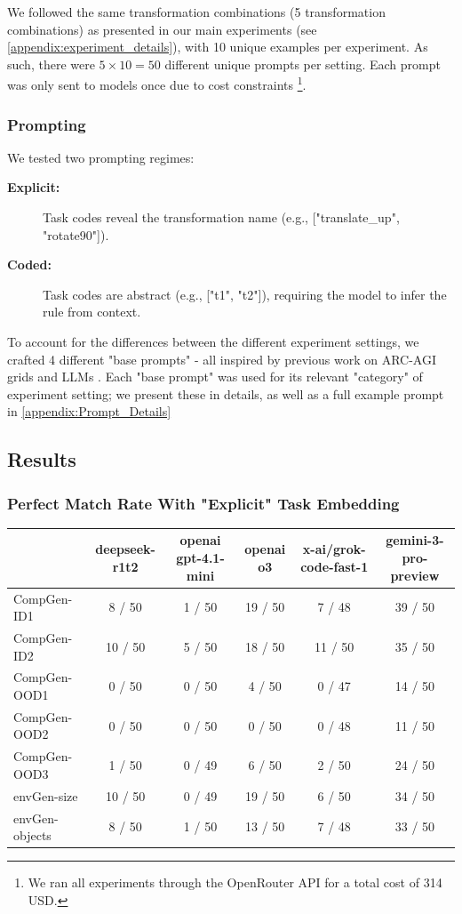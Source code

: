 We followed the same transformation combinations (5 transformation combinations) as presented in our main experiments (see \ref{appendix:experiment_details}), with 10 unique examples per experiment. As such, there were $5 \times 10 =  50$ different unique prompts per setting. Each prompt was only sent to models once due to cost constraints \footnote{We ran all experiments through the OpenRouter API for a total cost of 314 USD.}.

\subsubsection{Prompting}

We tested two prompting regimes:

\begin{description}
    \item [\textbf{Explicit:}] Task codes reveal the transformation name (e.g., ["translate\_up", "rotate90"]).
    \item [\textbf{Coded:}] Task codes are abstract (e.g., ["t1", "t2"]), requiring the model to infer the rule from context.
\end{description}

To account for the differences between the different experiment settings, we crafted 4 different "base prompts" - all inspired by previous work on ARC-AGI grids and LLMs \cite{Greenblatt_2024}. Each "base prompt" was used for its relevant "category" of experiment setting; we present these in details, as well as a full example prompt in \ref{appendix:Prompt_Details}


\subsection{Results} 

\subsubsection{Perfect Match Rate With "Explicit" Task Embedding}

\begin{table}[h!]
\centering
\begin{tabular}{lccccc}
\hline
 & deepseek-r1t2 & openai gpt-4.1-mini & openai o3 & x-ai/grok-code-fast-1 & gemini-3-pro-preview \\
\hline
CompGen-ID1 & 8 / 50 & 1 / 50 & 19 / 50 & 7 / 48 & 39 / 50 \\
CompGen-ID2 & 10 / 50 & 5 / 50 & 18 / 50 & 11 / 50 & 35 / 50 \\
CompGen-OOD1 & 0 / 50 & 0 / 50 & 4 / 50 & 0 / 47 & 14 / 50 \\
CompGen-OOD2 & 0 / 50 & 0 / 50 & 0 / 50 & 0 / 48 & 11 / 50 \\
CompGen-OOD3 & 1 / 50 & 0 / 49 & 6 / 50 & 2 / 50 & 24 / 50 \\
envGen-size & 10 / 50 & 0 / 49 & 19 / 50 & 6 / 50 & 34 / 50 \\
envGen-objects & 8 / 50 & 1 / 50 & 13 / 50 & 7 / 48 & 33 / 50 \\
\hline
\end{tabular}
\end{table}

